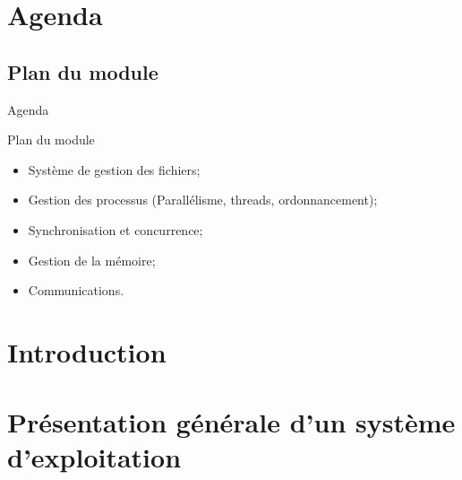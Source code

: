 \def\sectitle{Agenda}
\section{\sectitle}
\def\subsectitle{Plan du module}
\subsection{\subsectitle}

\begin{frame}{\sectitle}
\begin{block}{\subsectitle}
\begin{itemize}
\item Système de gestion des fichiers;
\item Gestion des processus (Parallélisme, threads, ordonnancement);
\item Synchronisation et concurrence;
\item Gestion de la mémoire;
\item Communications.
\end{itemize}
\end{block}
\end{frame}

\def\sectitle{Introduction}
\section{\sectitle}




\def\sectitle{Présentation générale d'un système d'exploitation}
\section{\sectitle}

